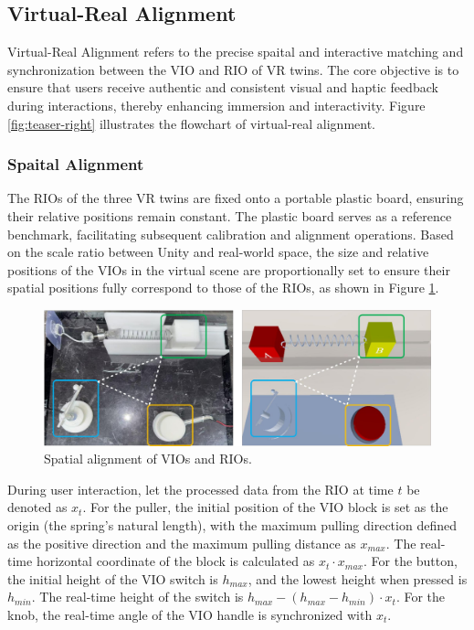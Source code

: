 \documentclass[runningheads]{llncs}
\begin{document}
\subsection{Virtual-Real Alignment}
Virtual-Real Alignment refers to the precise spaital and interactive matching and synchronization between the VIO and RIO of VR twins. The core objective is to ensure that users receive authentic and consistent visual and haptic feedback during interactions, thereby enhancing immersion and interactivity. Figure \ref{fig:teaser-right} illustrates the flowchart of virtual-real alignment.

\subsubsection{Spaital Alignment}
The RIOs of the three VR twins are fixed onto a portable plastic board, ensuring their relative positions remain constant. The plastic board serves as a reference benchmark, facilitating subsequent calibration and alignment operations. Based on the scale ratio between Unity and real-world space, the size and relative positions of the VIOs in the virtual scene are proportionally set to ensure their spatial positions fully correspond to those of the RIOs, as shown in Figure \ref{fig:spaital-alignment}.

\begin{figure}
  \centering
  \includegraphics[width=\linewidth]{image/spaital-alignment.pdf}
  \caption{Spatial alignment of VIOs and RIOs.}
  \label{fig:spaital-alignment}
\end{figure}

During user interaction, let the processed data from the RIO at time $t$ be denoted as $x_{t}$. For the puller, the initial position of the VIO block is set as the origin (the spring's natural length), with the maximum pulling direction defined as the positive direction and the maximum pulling distance as $x_{max}$. The real-time horizontal coordinate of the block is calculated as $x_{t} \cdot x_{max}$. For the button, the initial height of the VIO switch is $h_{max}$, and the lowest height when pressed is $h_{min}$. The real-time height of the switch is $h_{max}-(h_{max}-h_{min}) \cdot x_{t}$. For the knob, the real-time angle of the VIO handle is synchronized with $x_{t}$.
\end{document}
